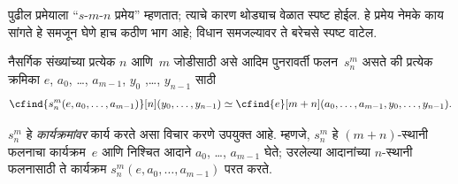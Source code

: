 \documentclass[../../../include/open-logic-section]{subfiles}
\begin{document}

\begin{explain}
पुढील प्रमेयाला ``$s$-$m$-$n$ प्रमेय'' म्हणतात; त्याचे कारण थोड्याच
वेळात स्पष्ट होईल. हे प्रमेय नेमके काय सांगते हे समजून घेणे हाच कठीण
भाग आहे; विधान समजल्यावर ते बरेचसे स्पष्ट वाटेल.
\end{explain}

\begin{thm}
  नैसर्गिक संख्यांच्या प्रत्येक $n$ आणि~$m$ जोडीसाठी असे आदिम
  पुनरावर्ती फलन~$s^m_n$ असते की प्रत्येक क्रमिका
  $e$, $a_0$, \dots, $a_{m-1}$, $y_0$ ,\dots, $y_{n-1}$ साठी
  \[
  \cfind{s^m_n(e, a_0, \dots, a_{m-1})}[n](y_0, \dots, y_{n-1}) \simeq
  \cfind{e}[m+n](a_0, \dots, a_{m-1}, y_0, \dots, y_{n-1}).
\]
\end{thm}

\begin{explain}
$s^m_n$ हे \emph{कार्यक्रमांवर} कार्य करते असा विचार करणे उपयुक्त आहे.
म्हणजे, $s^m_n$ हे $(m+n)$-स्थानी फलनाचा कार्यक्रम~$e$ आणि निश्चित
आदाने $a_0$, \dots, $a_{m-1}$ घेते; उरलेल्या आदानांच्या $n$-स्थानी
फलनासाठी ते कार्यक्रम
$s^m_n(e, a_0, \dots, a_{m-1})$ परत करते.
\end{explain}
\end{document}
